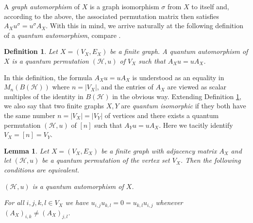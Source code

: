 \documentclass[a4paper]{amsart}
\newcommand*{\Hc}{\mathcal{H}}
\newenvironment{bnum}
{\begin{list}{}
    {\setlength{\labelwidth}{15pt}
     \setlength{\leftmargin}{\labelwidth}
    }
}
{\end{list}}
\numberwithin{equation}{section}
\theoremstyle{change}
\newtheorem{lemma}[theorem]{Lemma}
\newtheorem{definition}[theorem]{Definition}
\begin{document}
A \emph{graph automorphism} of $ X $ is a graph isomorphism $ \sigma $ from $ X $ to itself and, according to the above, the associated permutation matrix then satisfies $ A_X u^\sigma = u^\sigma A_X $. 
With this in mind, we arrive naturally at the following definition of a \emph{quantum automorphism}, compare \cite{BANICA_quthomogeneousgraphs}. 

\begin{definition} \label{defquatfinitegraph}
Let $ X = (V_X, E_X) $ be a finite graph. A quantum automorphism of $ X $ is a quantum permutation $ (\Hc,u) $ of $ V_X $ such that $ A_X u = u A_X $.  
\end{definition} 

In this definition, the formula $ A_X u = u A_X $ is understood as an equality in $ M_n(B(\Hc)) $ where $ n = |V_X| $, and the entries of $ A_X $ are viewed as scalar multiples of the identity in $ B(\Hc) $ in the obvious way. Extending Definition \ref{defquatfinitegraph}, we also say that two finite graphs $ X, Y $ are \emph{quantum isomorphic} if they both have the same number $ n = |V_X| = |V_Y| $ of vertices and there exists a quantum permutation $ (\Hc, u) $ of $ [n] $ such that $ A_Y u = u A_X $. Here we tacitly identify $ V_X = [n] = V_Y $. 

\begin{lemma} \label{adjacencyrelations}
Let $ X = (V_X, E_X) $ be a finite graph with adjacency matrix $ A_X $ and let $ (\Hc, u) $ be a quantum permutation of the vertex set $ V_X $. Then the following conditions are equivalent. 
\begin{bnum} 
\item[a)] $ (\Hc,u) $ is a quantum automorphism of $ X $. 
\item[b)] For all $ i,j,k,l \in V_X $ we have 
$
u_{i,j} u_{k,l} = 0 = u_{k,l} u_{i,j} 
$
whenever $ (A_X)_{i,k} \neq (A_X)_{j,l} $. 
\end{bnum} 
\end{lemma} 
\end{document}
